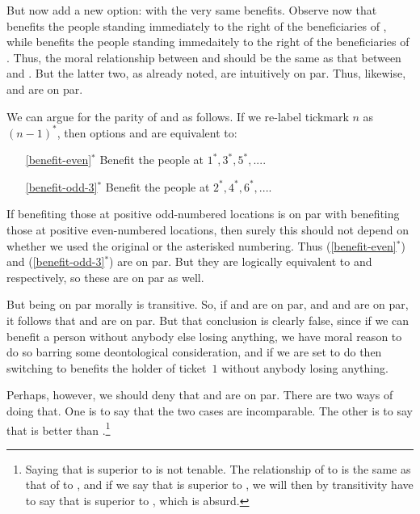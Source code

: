But now add a new option:
with the very same benefits. 
Observe now that  benefits the people standing immediately to the right of 
the beneficiaries of , while  benefits the people standing 
immedaitely to the right of the beneficiaries of . Thus,
the moral relationship between  and  should be the same as that
between  and . 
But the latter two, as already noted, are intuitively on par. 
Thus, likewise,  and  are on par. 

We can argue for the parity of  and  as follows. If we re-label 
tickmark $n$ as $(n-1)^*$, then options  and  are equivalent to:
\begin{itemize}
	\item[\ref{benefit-even}$^*$]{Benefit the people at $1^*,3^*,5^*,...$.}
	\item[\ref{benefit-odd-3}$^*$]{Benefit the people at $2^*,4^*,6^*,...$.}
\end{itemize}
If benefiting those at positive odd-numbered locations is on par with benefiting those at positive 
even-numbered locations, then surely this should not depend on whether we used the original or 
the asterisked numbering. Thus (\ref{benefit-even}$^*$) and (\ref{benefit-odd-3}$^*$) are on par.
But they are logically equivalent to  and  respectively, so these
are on par as well.

But being on par morally is transitive. So, if  and  are on par,
and  and  are on par, it follows that 
and  are on par. But that conclusion is clearly false, since if we can benefit a 
person without anybody else losing anything, we have moral reason to do so barring some deontological consideration,
and if we are set to do  then switching to  benefits the holder of 
ticket~$1$ without anybody losing anything.

Perhaps, however, we should deny that  and  are on par. There are two
ways of doing that. One is to say that the two cases are incomparable. The other is to say that 
is better than .\footnote{Saying that  is superior to 
 is not tenable. The relationship of  to  is the 
same as that of  to , and if we say that  is superior
to , we will then by transitivity have to say that  is superior to 
, which is absurd.}

